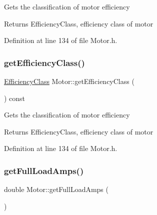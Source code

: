 Gets the classification of motor efficiency

\begin{DoxyReturn}{Returns}
Efficiency\+Class, efficiency class of motor 
\end{DoxyReturn}


Definition at line 134 of file Motor.\+h.

\mbox{\label{class_motor_a5d0078bdc164e5ed14334373f183be55}} 
\subsubsection{\texorpdfstring{get\+Efficiency\+Class()}{getEfficiencyClass()}\hspace{0.1cm}{\footnotesize\ttfamily [3/3]}}
{\footnotesize\ttfamily \hyperlink{class_motor_afa022971ae062406a9f588c601673d4e}{Efficiency\+Class} Motor\+::get\+Efficiency\+Class (\begin{DoxyParamCaption}{ }\end{DoxyParamCaption}) const\hspace{0.3cm}{\ttfamily [inline]}}

Gets the classification of motor efficiency

\begin{DoxyReturn}{Returns}
Efficiency\+Class, efficiency class of motor 
\end{DoxyReturn}


Definition at line 134 of file Motor.\+h.

\mbox{\label{class_motor_a612eb0dabb9623ee8e0866046527d16a}} 
\subsubsection{\texorpdfstring{get\+Full\+Load\+Amps()}{getFullLoadAmps()}\hspace{0.1cm}{\footnotesize\ttfamily [1/3]}}
{\footnotesize\ttfamily double Motor\+::get\+Full\+Load\+Amps (\begin{DoxyParamCaption}{ }\end{DoxyParamCaption})\hspace{0.3cm}{\ttfamily [inline]}}

